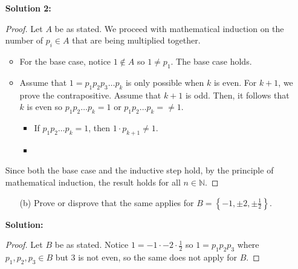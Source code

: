 \documentclass[letterpaper,12pt]{article}
\newcommand{\set}[1]{\left\{ #1 \right\}}
\theoremstyle{definition}
\begin{document}
\pagebreak
\begin{enumerate}
    \item[] \begin{mdframed}
     \textbf{Solution 2:}
     \begin{proof}
         Let $A$ be as stated. We proceed with mathematical induction on the number of $p_i \in A$ that are being multiplied together. \begin{itemize}
             \item For the base case, notice $1 \notin A$ so $1 \neq p_1$. The base case holds.
             \item  Assume that $1=p_1p_2p_3\ldots p_k$ is only possible when $k$ is even. For $k +1$, we prove the contrapositive. Assume that $k+1$ is odd. Then, it follows that $k$ is even so $p_1p_2\ldots p_k = 1$ or $p_1p_2\ldots p_k = \neq 1$. \begin{itemize}
                 \item If $p_1p_2\ldots p_k = 1$, then $1 \cdot p_{k+1} \neq 1$.
                 \item 
             \end{itemize}
         \end{itemize}
         Since both the base case and the inductive step hold, by the principle of mathematical induction, the result holds for all $n \in \mathbb{N}$.
     \end{proof}
 \end{mdframed}
\end{enumerate}
\pagebreak
\begin{enumerate}
    \item[] \begin{enumerate}
        \item[(b)] Prove or disprove that the same applies for $B = \set{-1, \pm 2, \pm \frac{1}{2}}$.
    \end{enumerate}
    \begin{mdframed}
        \textbf{Solution:}
        \renewcommand{\proofname}{Disproof}
        \begin{proof}
            Let $B$ be as stated. Notice $1 = -1 \cdot -2 \cdot \frac{1}{2}$ so $1 = p_1p_2p_3$ where $p_1,p_2,p_3 \in B$ but $3$ is not even, so the same does not apply for $B$.
        \end{proof}
    \end{mdframed}
\end{enumerate}
\pagebreak
\end{document}
